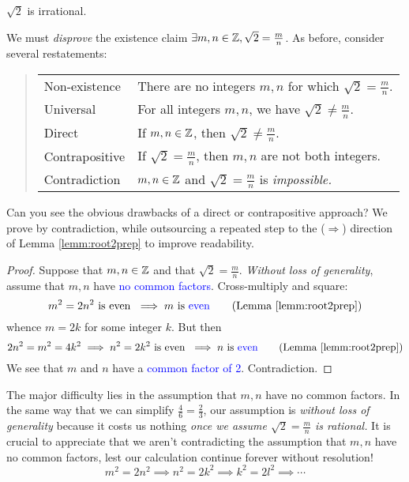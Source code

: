 \begin{thm}{}{}
	$\sqrt 2$ is irrational.
\end{thm}

We must \emph{disprove} the existence claim $\exists m,n\in\mathbb{Z}, \sqrt 2=\frac mn$.
As before, consider several restatements:\vspace{-5pt}
\begin{quote}
	\begin{tabular}{@{}ll}
		Non-existence& There are no integers $m,n$ for which $\sqrt 2=\frac mn$.\\
		Universal&For all integers $m,n$, we have $\sqrt 2\neq \frac mn$.\\
		Direct&If $m,n\in\mathbb{Z}$, then $\sqrt 2\neq\frac mn$.\\
		Contrapositive&If $\sqrt 2=\frac mn$, then $m,n$ are not both integers.\\
		Contradiction&$m,n\in\mathbb{Z}$ and $\sqrt 2=\frac mn$ is \emph{impossible.}
	\end{tabular}
\end{quote}

Can you see the obvious drawbacks of a direct or contrapositive approach?
We prove by contradiction, while outsourcing a repeated step to the ($\Rightarrow$) direction of Lemma \ref{lemm:root2prep} to improve readability.

\begin{proof}
	Suppose that $m,n\in\mathbb{Z}$ and that $\sqrt 2=\frac mn$. \emph{Without loss of generality}, assume that $m,n$ have \textcolor{blue}{no common factors}. Cross-multiply and square:
	\[
		m^2=2n^2\text{ is even }\implies m\text{ is \textcolor{blue}{even}} \tag{Lemma \ref{lemm:root2prep}}
	\]
	whence $m=2k$ for some integer $k$. But then
	\[
		2n^2=m^2=4k^2\implies n^2=2k^2\text{ is even }\implies n\text{ is \textcolor{blue}{even}} \tag{Lemma \ref{lemm:root2prep}}
	\]
	We see that $m$ and $n$ have a \textcolor{blue}{common factor of 2}. Contradiction.
\end{proof}


The major difficulty lies in the assumption that $m,n$ have no common factors. In the same way that we can simplify $\frac 46=\frac 23$, our assumption is \emph{without loss of generality} because it costs us nothing \emph{once we assume $\sqrt 2=\frac mn$ is rational.} It is crucial to appreciate that we aren't contradicting the assumption that $m,n$ have no common factors, lest our calculation continue forever without resolution!
\[
	m^2=2n^2\implies n^2=2k^2\implies k^2=2l^2\implies\cdots
\]


